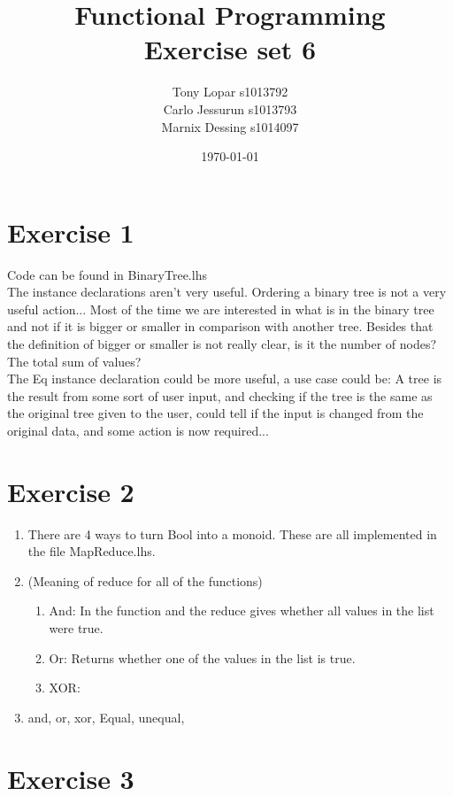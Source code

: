 \documentclass{article}
\begin{document}
\title{Functional Programming \\ Exercise set 6}
\date{\today}
\author{Tony Lopar s1013792 \\ Carlo Jessurun s1013793 \\ Marnix Dessing s1014097}
\maketitle

\section*{Exercise 1}
Code can be found in BinaryTree.lhs\\
The instance declarations aren't very useful. Ordering a binary tree is not a very useful action... Most of the time we are interested in what is in the binary tree and not if it is bigger or smaller in comparison with another tree. Besides that the definition of bigger or smaller is not really clear, is it the number of nodes? The total sum of values?\\
The Eq instance declaration could be more useful, a use case could be: A tree is the result from some sort of user input, and checking if the tree is the same as the original tree given to the user, could tell if the input is changed from the original data, and some action is now required...

\section*{Exercise 2}
\begin{enumerate}
  \item There are 4 ways to turn Bool into a monoid. These are all implemented in the file MapReduce.lhs.
  \item (Meaning of reduce for all of the functions)
  \begin{enumerate}[label=\roman*)]
    \item And: In the function and the reduce gives whether all values in the list were true.
    \item Or: Returns whether one of the values in the list is true.
    \item XOR:
  \end{enumerate}
  \item and, or, xor, Equal, unequal,
\end{enumerate}

\section*{Exercise 3}
\end{document}
